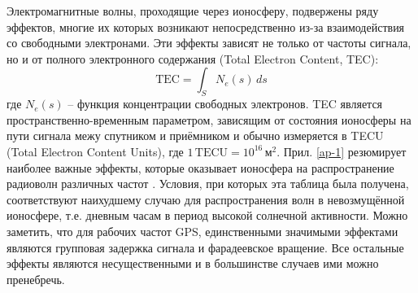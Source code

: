 Электромагнитные волны, проходящие через ионосферу, подвержены ряду эффектов, многие их которых возникают непосредственно из-за взаимодействия со свободными электронами.
Эти эффекты зависят не только от частоты сигнала, но и от полного электронного содержания (Total Electron Content, TEC):
\begin{equation}
\text{TEC}=\int_S N_e(s)\,ds    
\end{equation}
где 
$N_e(s)$ -- функция концентрации свободных электронов.  
TEC является пространственно-временным параметром, зависящим от состояния ионосферы на пути сигнала межу спутником и приёмником и обычно измеряется в TECU (Total Electron Content Units), где $1\,\text{TECU}=10^{16}\,\text{м}^2$.
Прил. \ref{ap-1} резюмирует наиболее важные эффекты, которые оказывает ионосфера на распространение радиоволн различных частот \cite{ITU-R2015}.
Условия, при которых эта таблица была получена, соответствуют наихудшему случаю для распространения волн в невозмущённой ионосфере, т.е. дневным часам в период высокой солнечной активности. 
Можно заметить, что для рабочих частот GPS, единственными значимыми эффектами являются групповая задержка сигнала и фарадеевское вращение.
Все остальные эффекты являются несущественными и в большинстве случаев ими можно пренебречь.